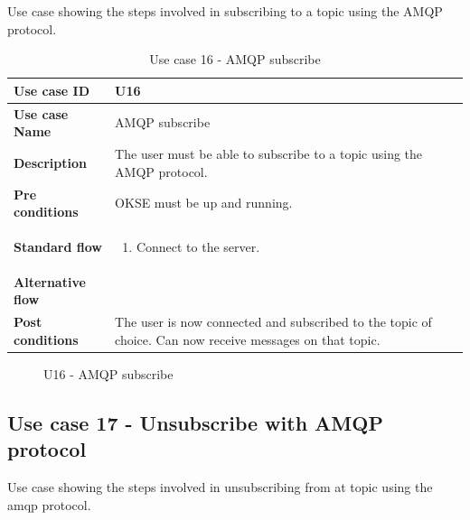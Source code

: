 Use case showing the steps involved in subscribing to a topic using the AMQP protocol.   

\begin{table}[ht!]
\centering
\begin{tabular}{|l|p{5cm}|}
\hline
\textbf{Use case ID} & U16 \\ \hline
\textbf{Use case Name} & AMQP subscribe\\ \hline
\textbf{Description} & The user must be able to subscribe to a topic using the AMQP protocol. \\ \hline
\textbf{Pre conditions} & OKSE must be up and running. \\ \hline
\textbf{Standard flow} & \begin{enumerate}
\item Connect to the server.
\end{enumerate} \\ \hline
\textbf{Alternative flow} & \\ \hline
\textbf{Post conditions} & The user is now connected and subscribed to the topic of choice. Can now receive messages on that topic. \\ \hline
\end{tabular}
\caption{Use case 16 - AMQP subscribe}
\label{uc16}
\end{table}

\begin{center}
  \begin{figure}[ht!]
    \caption{U16 - AMQP subscribe}
    \label{fig:u16}
  \end{figure}
\end{center}

\clearpage

\subsection{Use case 17 - Unsubscribe with AMQP protocol}
\label{subsec:requirements_engineering-use_cases-unsub_amqp}

Use case showing the steps involved in unsubscribing from at topic using the amqp protocol. 

